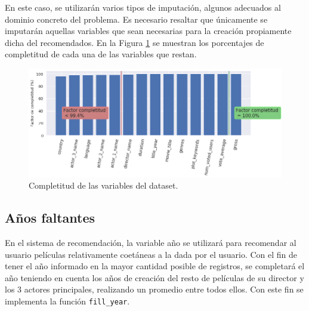 En este caso, se utilizarán varios tipos de imputación, algunos adecuados al dominio concreto del problema. Es necesario resaltar que únicamente se imputarán aquellas variables que sean necesarias para la creación propiamente dicha del recomendados. En la Figura \ref{fig:completion} se muestran los porcentajes de completitud de cada una de las variables que restan.

\begin{figure}[H]
    \centering
    \captionsetup{width=12cm}
    \includegraphics[width= 13cm]{./contenido/imagenes/completion.png}
\caption{Completitud de las variables del dataset.}
\label{fig:completion}
\end{figure}


\subsection{Años faltantes}

En el sistema de recomendación, la variable año se utilizará para recomendar al usuario películas relativamente coetáneas a la dada por el usuario. Con el fin de tener el año informado en la mayor cantidad posible de registros, se completará el año teniendo en cuenta los años de creación del resto de películas de su director y los 3 actores principales, realizando un promedio entre todos ellos. Con este fin se implementa la función \texttt{fill\_year}.


